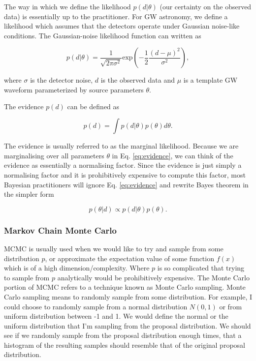 %
%
The way in which we define the likelihood $p(d|\theta)$ (our certainty on the observed data) is essentially up to the practitioner. For \ac{GW} astronomy, we define a likelihood which assumes that the detectors operate under Gaussian noise-like conditions. The Gaussian-noise likelihood function can written as 

\begin{equation}
    p(d|\theta) = \frac{1}{\sqrt{2\pi \sigma^2}} \textrm{exp}\left(-\frac{1}{2} 
    \frac{(d - \mu)^2}{\sigma^2}\right),
\end{equation}

where $\sigma$ is the detector noise, $d$ is the observed data and $\mu$ is a template \ac{GW} waveform parameterized by source parameters $\theta$. 

%
%
The evidence $p(d)$ can be defined as 

\begin{equation}
    p(d) = \int p(d|\theta) p(\theta) d\theta.
    \label{eq:evidence}
\end{equation}

The evidence is usually referred to as the marginal likelihood. Because we are marginalising over all parameters $\theta$ in Eq. \ref{eq:evidence}, we can think of the evidence as essentially a normalising factor. Since the evidence is just simply a normalising factor and it is prohibitively expensive to compute this factor, most Bayesian practitioners will ignore Eq. \ref{eq:evidence} and rewrite Bayes theorem in the simpler form 

\begin{equation}
    p(\theta | d) \propto p(d | \theta) p(\theta).
\end{equation}

\subsubsection{Markov Chain Monte Carlo}

%
\ac{MCMC} is usually used when we would like to try and sample from some distribution $p$, or approximate the expectation value of some function $f(x)$ which is of a high dimension/complexity. Where $p$ is so complicated that trying to sample from $p$ analytically would be prohibitively expensive. The Monte Carlo portion of \ac{MCMC} refers to a technique known as Monte Carlo sampling. Monte Carlo sampling means to randomly sample from some distribution. For example, I could choose to randomly sample from a normal distribution $N(0,1)$ or from uniform distribution between -1 and 1. We would define the normal or the uniform distribution that I'm sampling from the proposal distribution. We should see if we randomly sample from the proposal distribution enough times, that a histogram of the resulting samples should resemble that of the original proposal distribution. 


